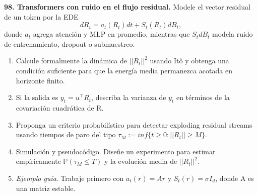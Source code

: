 \documentclass[11pt, letterpaper]{article}
\begin{document}
\newpage
\begin{ejercicio}
    \textbf{98. Transformers con ruido en el flujo residual.} Modele el vector residual de un token por la EDE
    \[ dR_{t}=a_{t}(R_{t})dt+S_{t}(R_{t})dB_{t}, \]
    donde $a_{t}$ agrega atención y MLP en promedio, mientras que $S_{t}dB_{t}$ modela ruido de entrenamiento, dropout o submuestreo.
    \begin{enumerate}
        \item Calcule formalmente la dinámica de $||R_{t}||^{2}$ usando Itô y obtenga una condición suficiente para que la energía media permanezca acotada en horizonte finito.
        \item Si la salida es $y_{t}=u^{\top}R_{t}$, describa la varianza de $y_{t}$ en términos de la covariación cuadrática de R.
        \item Proponga un criterio probabilístico para detectar exploding residual streams usando tiempos de paro del tipo $\tau_{M}:=inf\{t\ge0:||R_{t}||\ge M\}$.
        \item Simulación y pseudocódigo. Diseñe un experimento para estimar empíricamente $\mathbb{P}(\tau_{M}\le T)$ y la evolución media de $||R_{t}||^{2}$.
        \item \textit{Ejemplo guía}. Trabaje primero con $a_{t}(r)=Ar$ y $S_{t}(r)=\sigma I_{d}$, donde A es una matriz estable.
    \end{enumerate}
\end{ejercicio}

\vspace{5mm}
\end{document}
